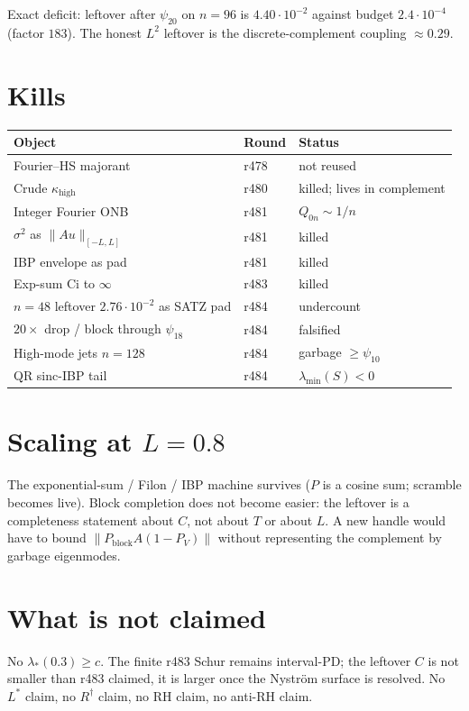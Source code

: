 \documentclass[11pt]{article}
\theoremstyle{remark}
\begin{document}
Exact deficit: leftover after $\psi_{20}$ on $n=96$
is $4.40\cdot10^{-2}$ against budget $2.4\cdot10^{-4}$
(factor $183$).
The honest $L^2$ leftover is the discrete-complement
coupling $\approx0.29$.

\section{Kills}

\begin{center}
\small
\begin{tabular}{@{}lll@{}}
\toprule
Object & Round & Status \\
\midrule
Fourier--HS majorant & r478 & not reused \\
Crude $\kappa_{\mathrm{high}}$ & r480 & killed; lives in complement \\
Integer Fourier ONB & r481 & $Q_{0n}\sim1/n$ \\
$\sigma^2$ as $\|Au\|_{[-L,L]}$ & r481 & killed \\
IBP envelope as pad & r481 & killed \\
Exp-sum Ci to $\infty$ & r483 & killed \\
$n=48$ leftover $2.76\cdot10^{-2}$ as SATZ pad & r484 & undercount \\
$20\times$ drop / block through $\psi_{18}$ & r484 & falsified \\
High-mode jets $n=128$ & r484 & garbage $\ge\psi_{10}$ \\
QR sinc-IBP tail & r484 & $\lambda_{\min}(S)<0$ \\
\bottomrule
\end{tabular}
\end{center}

\section{Scaling at $L=0.8$}

The exponential-sum / Filon / IBP machine survives
($P$ is a cosine sum; scramble becomes live).
Block completion does not become easier:
the leftover is a completeness statement about $C$,
not about $T$ or about $L$.
A new handle would have to bound
$\|P_{\mathrm{block}}A(1-P_V)\|$ without representing
the complement by garbage eigenmodes.

\section{What is not claimed}

No $\lambda_*(0.3)\ge c$.
The finite r483 Schur remains interval-PD;
the leftover $C$ is not smaller than r483 claimed,
it is larger once the Nystr\"om surface is resolved.
No $L^*$ claim, no $R^\dagger$ claim, no RH claim,
no anti-RH claim.
\end{document}

